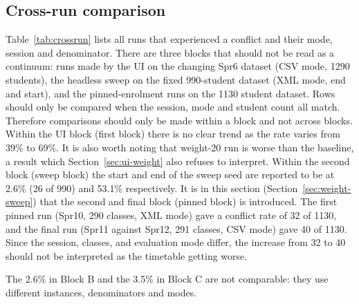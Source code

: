 \documentclass[journal]{IEEEtran}
\begin{document}
\subsection{Cross-run comparison}

Table~\ref{tab:crossrun} lists all runs that experienced a conflict and their mode, session and denominator. There are three blocks that should not be read as a continuum: runs made by the UI on the changing Spr6 dataset (CSV mode, 1290 students), the headless sweep on the fixed 990-student dataset (XML mode, end and start), and the pinned-enrolment runs on the 1130 student dataset. Rows should only be compared when the session, mode and student count all match. Therefore comparisons should only be made within a block and not across blocks. Within the UI block (first block) there is no clear trend as the rate varies from 39\% to 69\%. It is also worth noting that weight-20 run is worse than the baseline, a result which Section~\ref{sec:ui-weight} also refuses to interpret. Within the second block (sweep block) the start and end of the sweep seed are reported to be at 2.6\% (26 of 990) and 53.1\% respectively. It is in this section (Section~\ref{sec:weight-sweep}) that the second and final block (pinned block) is introduced. The first pinned run (Spr10, 290 classes, XML mode) gave a conflict rate of 32 of 1130, and the final run (Spr11 against Spr12, 291 classes, CSV mode) gave 40 of 1130. Since the session, classes, and evaluation mode differ, the increase from 32 to 40 should not be interpreted as the timetable getting worse.

The 2.6\% in Block B and the 3.5\% in Block C are not
comparable: they use different instances, denominators and modes.
\end{document}
